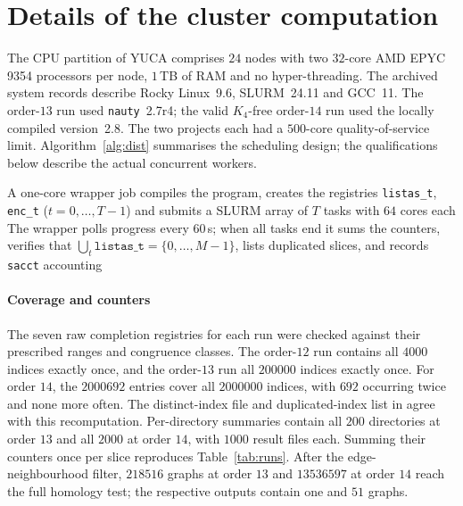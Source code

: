 \section{Details of the cluster computation}\label{app:cluster}

The CPU partition of YUCA comprises $24$ nodes with two $32$-core AMD EPYC 9354 processors per node, $1$\,TB of RAM and no hyper-threading. The archived system records describe Rocky Linux~9.6, SLURM~24.11 and GCC~11. The order-$13$ run used \texttt{nauty}~2.7r4; the valid $K_4$-free order-$14$ run used the locally compiled version~2.8. The two projects each had a $500$-core quality-of-service limit. Algorithm~\ref{alg:dist} summarises the scheduling design; the qualifications below describe the actual concurrent workers.

\begin{algorithm}[t]
\caption{Distributed search on the cluster}\label{alg:dist}
A one-core wrapper job compiles the program, creates the registries \texttt{listas\_t}, \texttt{enc\_t} ($t=0,\dots,T-1$) and submits a SLURM array of $T$ tasks with $64$ cores each\;
The wrapper polls progress every $60$\,s; when all tasks end it sums the counters, verifies that $\bigcup_t\texttt{listas\_t}=\{0,\dots,M-1\}$, lists duplicated slices, and records \texttt{sacct} accounting\;
\end{algorithm}

\paragraph{Coverage and counters}
The seven raw completion registries for each run were checked against their prescribed ranges and congruence classes. The order-$12$ run contains all $\num{4000}$ indices exactly once, and the order-$13$ run all $\num{200000}$ indices exactly once. For order $14$, the $\num{2000692}$ entries cover all $\num{2000000}$ indices, with $692$ occurring twice and none more often. The distinct-index file and duplicated-index list in \protect{} agree with this recomputation. Per-directory summaries contain all $200$ directories at order $13$ and all $\num{2000}$ at order $14$, with $\num{1000}$ result files each. Summing their counters once per slice reproduces Table~\ref{tab:runs}. After the edge-neighbourhood filter, $\num{218516}$ graphs at order $13$ and $\num{13536597}$ at order $14$ reach the full homology test; the respective outputs contain one and $51$ graphs.


